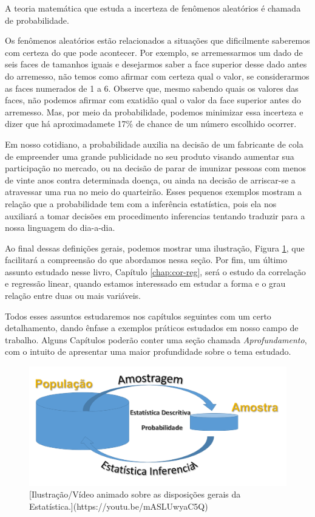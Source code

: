 \documentclass[
]{book}
\begin{document}
\leavevmode\hypertarget{def:prob}{}%
A teoria matemática que estuda a incerteza de fenômenos aleatórios é chamada de probabilidade.

Os fenômenos aleatórios estão relacionados a situações que dificilmente saberemos com certeza do que pode acontecer. Por exemplo, se arremessarmos um dado de seis faces de tamanhos iguais e desejarmos saber a face superior desse dado antes do arremesso, não temos como afirmar com certeza qual o valor, se considerarmos as faces numerados de 1 a 6. Observe que, mesmo sabendo quais os valores das faces, não podemos afirmar com exatidão qual o valor da face superior antes do arremesso. Mas, por meio da probabilidade, podemos minimizar essa incerteza e dizer que há aproximadamete 17\% de chance de um número escolhido ocorrer.

Em nosso cotidiano, a probabilidade auxilia na decisão de um fabricante de cola de empreender uma grande publicidade no seu produto visando aumentar sua participação no mercado, ou na decisão de parar de imunizar pessoas com menos de vinte anos contra determinada doença, ou ainda na decisão de arriscar-se a atravessar uma rua no meio do quarteirão. Esses pequenos exemplos mostram a relação que a probabilidade tem com a inferência estatística, pois ela nos auxiliará a tomar decisões em procedimento inferencias tentando traduzir para a nossa linguagem do dia-a-dia.

Ao final dessas definições gerais, podemos mostrar uma ilustração, Figura \ref{fig:dispgerais}, que facilitará a compreensão do que abordamos nessa seção. Por fim, um último assunto estudado nesse livro, Capítulo \ref{chap:cor-reg}, será o estudo da correlação e regressão linear, quando estamos interessado em estudar a forma e o grau relação entre duas ou mais variáveis.

Todos esses assuntos estudaremos nos capítulos seguintes com um certo detalhamento, dando ênfase a exemplos práticos estudados em nosso campo de trabalho. Alguns Capítulos poderão conter uma seção chamada \emph{Aprofundamento}, com o intuito de apresentar uma maior profundidade sobre o tema estudado.

\begin{figure}

{\centering \includegraphics[width=1\linewidth]{images/book-epaec001-Disposicoes_Gerais} 

}

\caption{[Ilustração/Vídeo animado sobre as disposições gerais da Estatística.](https://youtu.be/mASLUwyaC5Q)}\label{fig:dispgerais}
\end{figure}
\end{document}
